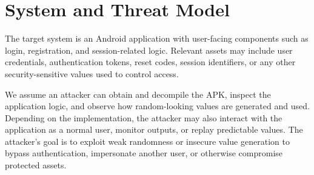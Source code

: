 \section{System and Threat Model}

The target system is an Android application with user-facing components such as
login, registration, and session-related logic. Relevant assets may include user
credentials, authentication tokens, reset codes, session identifiers, or any
other security-sensitive values used to control access.

We assume an attacker can obtain and decompile the APK, inspect the application
logic, and observe how random-looking values are generated and used. Depending
on the implementation, the attacker may also interact with the application as a
normal user, monitor outputs, or replay predictable values. The attacker's goal
is to exploit weak randomness or insecure value generation to bypass
authentication, impersonate another user, or otherwise compromise protected
assets.
